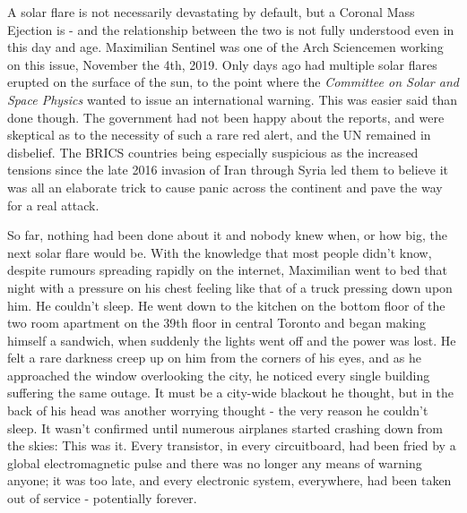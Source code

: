 A solar flare is not necessarily devastating by default, but a Coronal Mass Ejection is - and the relationship between the two is not fully understood even in this day and age. Maximilian Sentinel was one of the Arch Sciencemen working on this issue, November the 4th, 2019. Only days ago had multiple solar flares erupted on the surface of the sun, to the point where the \textit{Committee on Solar and Space Physics} wanted to issue an international warning. This was easier said than done though. The government had not been happy about the reports, and were skeptical as to the necessity of such a rare red alert, and the UN remained in disbelief. The BRICS countries being especially suspicious as the increased tensions since the late 2016 invasion of Iran through Syria led them to believe it was all an elaborate trick to cause panic across the continent and pave the way for a real attack.

So far, nothing had been done about it and nobody knew when, or how big, the next solar flare would be. With the knowledge that most people didn't know, despite rumours spreading rapidly on the internet, Maximilian went to bed that night with a pressure on his chest feeling like that of a truck pressing down upon him. He couldn't sleep. He went down to the kitchen on the bottom floor of the two room apartment on the 39th floor in central Toronto and began making himself a sandwich, when suddenly the lights went off and the power was lost. He felt a rare darkness creep up on him from the corners of his eyes, and as he approached the window overlooking the city, he noticed every single building suffering the same outage. It must be a city-wide blackout he thought, but in the back of his head was another worrying thought - the very reason he couldn't sleep. It wasn't confirmed until numerous airplanes started crashing down from the skies: This was it. Every transistor, in every circuitboard, had been fried by a global electromagnetic pulse and there was no longer any means of warning anyone; it was too late, and every electronic system, everywhere, had been taken out of service - potentially forever.     

